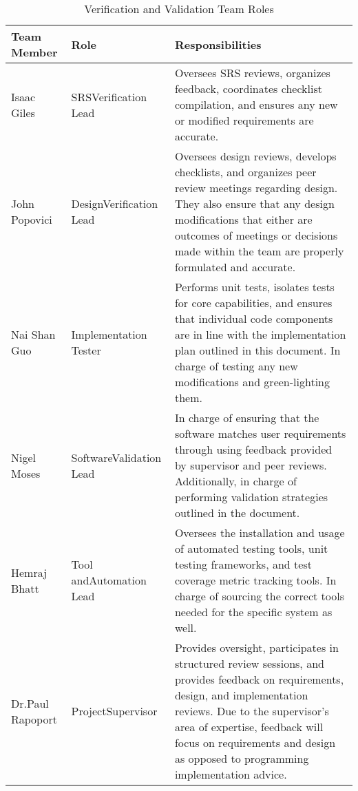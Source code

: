 \documentclass[12pt, titlepage]{article}
\begin{document}
\begin{table}[H]
  \centering
  \begin{adjustbox}{max width=0.9\textwidth} 
    \begin{tabularx}{\linewidth}{|p{2.5cm}|p{2.75cm}|X|} 
    \hline
    \textbf{Team Member} & \textbf{Role} & \textbf{Responsibilities} \\ \hline
    Isaac Giles & SRS\newline Verification Lead & Oversees SRS reviews, organizes feedback, coordinates checklist compilation, and ensures any new or modified requirements are accurate. \\ \hline
    John Popovici & Design\newline Verification Lead & Oversees design reviews, develops checklists, and organizes peer review meetings regarding design. They also ensure that any design modifications that either are outcomes of meetings or decisions made within the team are properly formulated and accurate.  \\ \hline
    Nai Shan Guo & Implementation Tester & Performs unit tests, isolates tests for core capabilities, and ensures that individual code components are in line with the implementation plan outlined in this document. In charge of testing any new modifications and green-lighting them. \\ \hline
    Nigel Moses & Software\newline Validation Lead & In charge of ensuring that the software matches user requirements through using feedback provided by supervisor and peer reviews. Additionally, in charge of performing validation strategies outlined in the document. \\ \hline
    Hemraj Bhatt & Tool and\newline Automation Lead & Oversees the installation and usage of automated testing tools, unit testing frameworks, and test coverage metric tracking tools. In charge of sourcing the correct tools needed for the specific system as well. \\ \hline
    Dr.\newline Paul Rapoport & Project\newline Supervisor & Provides oversight, participates in structured review sessions, and provides feedback on requirements, design, and implementation reviews. Due to the supervisor's area of expertise, feedback will focus on requirements and design as opposed to programming implementation advice. \\ \hline
    \end{tabularx}
  \end{adjustbox}
  \caption{Verification and Validation Team Roles}
  \label{tab:team}
\end{table}
\end{document}
